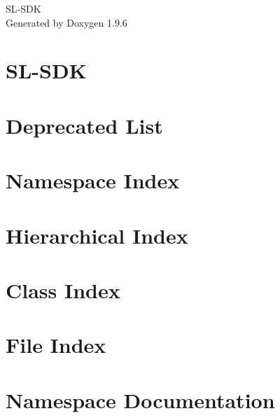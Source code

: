 \documentclass[twoside]{book}
\newcommand{\+}{\discretionary{\mbox{\scriptsize$\hookleftarrow$}}{}{}}
\newcommand{\clearemptydoublepage}{%
    \newpage{\pagestyle{empty}\cleardoublepage}%
  }
\begin{document}
  \raggedbottom
    \hypersetup{pageanchor=false,
                bookmarksnumbered=true,
                pdfencoding=unicode
               }
  \begin{titlepage}
  \vspace*{7cm}
  \begin{center}%
  {\Large SL-\/\+SDK}\\
  \vspace*{1cm}
  {\large Generated by Doxygen 1.9.6}\\
  \end{center}
  \end{titlepage}
  \clearemptydoublepage
  \tableofcontents
  \clearemptydoublepage
  \hypersetup{pageanchor=true}
\chapter{SL-\/\+SDK}
\label{index}\hypertarget{index}{}
\chapter{Deprecated List}
\label{deprecated}

\chapter{Namespace Index}

\chapter{Hierarchical Index}

\chapter{Class Index}

\chapter{File Index}

\chapter{Namespace Documentation}










\end{document}
